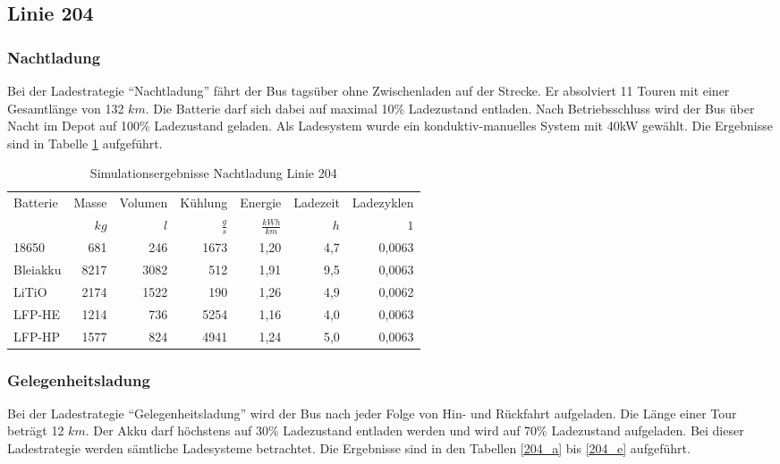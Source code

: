 \subsection{Linie 204}
\subsubsection{Nachtladung}
Bei der Ladestrategie "`Nachtladung"' fährt der Bus tagsüber ohne Zwischenladen auf der Strecke. Er absolviert 11 Touren mit einer Gesamtlänge von 132 $km$. Die Batterie darf sich dabei auf maximal 10\% Ladezustand entladen. Nach Betriebsschluss wird der Bus über Nacht im Depot auf 100\% Ladezustand geladen. Als Ladesystem wurde ein konduktiv-manuelles System mit 40kW gewählt. Die Ergebnisse sind in Tabelle \ref{204nacht} aufgeführt.

\begin{table}\centering
	\begin{tabularx}{\textwidth}{Xrrrrrr}
		\toprule
		Batterie & Masse & Volumen &       Kühlung &          Energie & Ladezeit & Ladezyklen \\
		         &  $kg$ &     $l$ & $\frac{g}{s}$ & $\frac{kWh}{km}$ &      $h$ &        $1$ \\ \midrule
		18650    &   681 &     246 &          1673 &             1,20 &      4,7 &     0,0063 \\
		Bleiakku &  8217 &    3082 &           512 &             1,91 &      9,5 &     0,0063 \\
		LiTiO    &  2174 &    1522 &           190 &             1,26 &      4,9 &     0,0062 \\
		LFP-HE   &  1214 &     736 &          5254 &             1,16 &      4,0 &     0,0063 \\
		LFP-HP   &  1577 &     824 &          4941 &             1,24 &      5,0 &     0,0063 \\ \bottomrule
	\end{tabularx}
	\caption{Simulationsergebnisse Nachtladung Linie 204}
	\label{204nacht}
\end{table}
\subsubsection{Gelegenheitsladung}
Bei der Ladestrategie "`Gelegenheitsladung"' wird der Bus nach jeder Folge von Hin- und Rückfahrt aufgeladen. Die Länge einer Tour beträgt 12 $km$. Der Akku darf höchstens auf 30\% Ladezustand entladen werden und wird auf 70\% Ladezustand aufgeladen. Bei dieser Ladestrategie werden sämtliche Ladesysteme betrachtet. Die Ergebnisse sind in den Tabellen \ref{204_a} bis \ref{204_e} aufgeführt.

